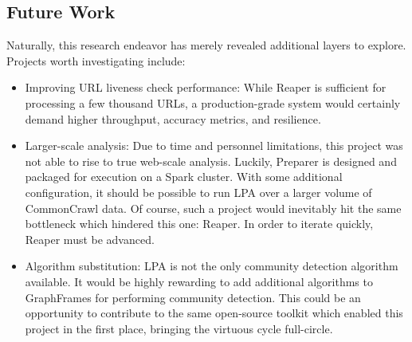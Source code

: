 \documentclass[conference]{IEEEtran}
\begin{document}
\subsection{Future Work}

Naturally, this research endeavor has merely revealed additional layers to explore. Projects worth investigating include:
\begin{itemize}
	\item Improving URL liveness check performance: While Reaper is sufficient for processing a few thousand URLs, a production-grade system would certainly demand higher throughput, accuracy metrics, and resilience.
	\item Larger-scale analysis: Due to time and personnel limitations, this project was not able to rise to true web-scale analysis. Luckily, Preparer is designed and packaged for execution on a Spark cluster. With some additional configuration, it should be possible to run LPA over a larger volume of CommonCrawl data. Of course, such a project would inevitably hit the same bottleneck which hindered this one: Reaper. In order to iterate quickly, Reaper must be advanced.
	\item Algorithm substitution: LPA is not the only community detection algorithm available. It would be highly rewarding to add additional algorithms to GraphFrames for performing community detection. This could be an opportunity to contribute to the same open-source toolkit which enabled this project in the first place, bringing the virtuous cycle full-circle.
\end{itemize}



\end{document}
